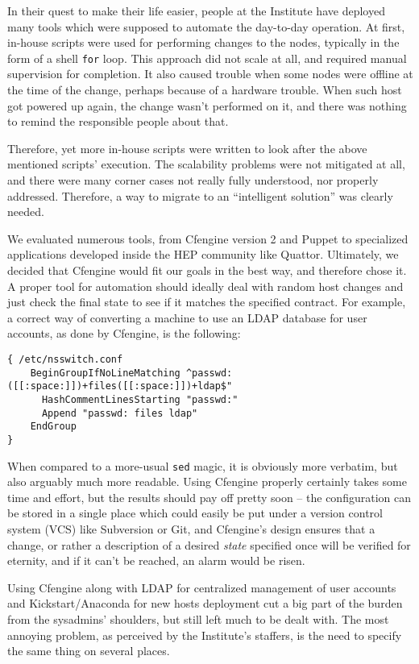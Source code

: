 \documentclass[11pt]{article}
\begin{document}
In their quest to make their life easier, people at the Institute have deployed
many tools which were supposed to automate the day-to-day operation.  At first,
in-house scripts were used for performing changes to the nodes, typically in the
form of a shell {\tt for} loop.  This approach did not scale at all, and
required manual supervision for completion.  It also caused trouble when some
nodes were offline at the time of the change, perhaps because of a hardware
trouble.  When such host got powered up again, the change wasn't performed on
it, and there was nothing to remind the responsible people about that.

Therefore, yet more in-house scripts were written to look after the above
mentioned scripts' execution.  The scalability problems were not mitigated at
all, and there were many corner cases not really fully understood, nor properly
addressed.  Therefore, a way to migrate to an ``intelligent solution'' was
clearly needed.

We evaluated numerous tools, from Cfengine version 2 and Puppet to specialized
applications developed inside the HEP community like Quattor.  Ultimately, we
decided that Cfengine would fit our goals in the best way, and therefore chose
it.  A proper tool for automation should ideally deal with random host changes
and just check the final state to see if it matches the specified contract.  For
example, a correct way of converting a machine to use an LDAP database for user
accounts, as done by Cfengine, is the following:

{\scriptsize
\begin{verbatim}
{ /etc/nsswitch.conf
    BeginGroupIfNoLineMatching ^passwd:([[:space:]])+files([[:space:]])+ldap$"
      HashCommentLinesStarting "passwd:"
      Append "passwd: files ldap"
    EndGroup
}
\end{verbatim}
}

When compared to a more-usual {\tt sed} magic, it is obviously more verbatim,
but also arguably much more readable.  Using Cfengine properly certainly takes
some time and effort, but the results should pay off pretty soon -- the
configuration can be stored in a single place which could easily be put under a
version control system (VCS) like Subversion or Git, and Cfengine's design
ensures that a change, or rather a description of a desired {\em state}
specified once will be verified for eternity, and if it can't be reached, an
alarm would be risen.

Using Cfengine along with LDAP for centralized management of user accounts and
Kickstart/Anaconda for new hosts deployment cut a big part of the burden from the
sysadmins' shoulders, but still left much to be dealt with.  The most annoying
problem, as perceived by the Institute's staffers, is the need to specify the
same thing on several places.
\end{document}

